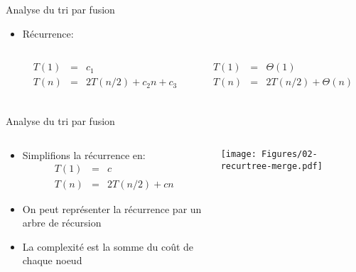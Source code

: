 \begin{frame}{Analyse du tri par fusion}

\begin{center}
\end{center}

\begin{itemize}
\item Récurrence:
\begin{columns}
\begin{column}{5cm}
\begin{eqnarray*}
T(1) & = & c_1\\
T(n) & = & 2 T(n/2)+c_2 n+c_3\\
\end{eqnarray*}
\end{column}
\begin{column}{5cm}
\begin{eqnarray*}
T(1) & = & \Theta(1)\\
T(n) & = & 2 T(n/2)+\Theta(n)\\
\end{eqnarray*}
\end{column}
\end{columns}
\end{itemize}
\end{frame}

\begin{frame}{Analyse du tri par fusion}
\begin{columns}
\begin{column}{6cm}
\begin{itemize}
\item Simplifions la récurrence en:
\begin{eqnarray*}
T(1) & = & c\\
T(n) & = & 2 T(n/2)+c n
\end{eqnarray*}
\item On peut représenter la récurrence par un arbre de récursion
\item La complexité est la somme du coût de chaque noeud
\end{itemize}
\end{column}
\begin{column}{5.5cm}
\centerline{\texttt{[image: Figures/02-recurtree-merge.pdf]}}
\end{column}
\end{columns}
\end{frame}

